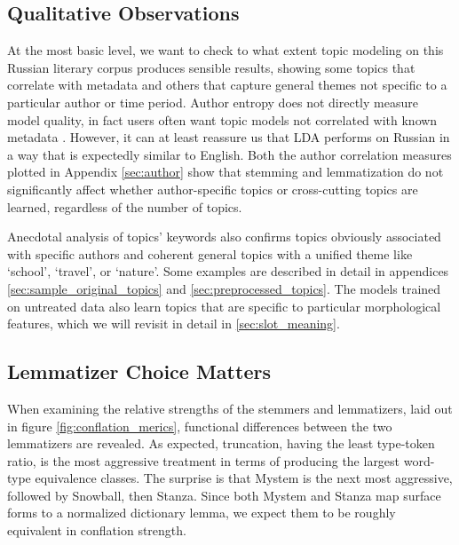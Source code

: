 \documentclass[11pt,a4paper]{article}
\begin{document}
\subsection{Qualitative Observations}
At the most basic level, we want to check to what extent topic modeling on this Russian literary corpus produces sensible results, showing some topics that correlate with metadata and others that capture general themes not specific to a particular author or time period. Author entropy does not directly measure model quality, in fact users often want topic models not correlated with known metadata \cite{Thompson2018AuthorlessTM}. However, it can at least reassure us that LDA performs on Russian in a way that is expectedly similar to English. Both the author correlation measures plotted in Appendix \ref{sec:author} show that stemming and lemmatization do not significantly affect whether author-specific topics or cross-cutting topics are learned, regardless of the number of topics.

Anecdotal analysis of topics' keywords also confirms topics obviously associated with specific authors and coherent general topics with a unified theme like `school', `travel', or `nature'. Some examples are described in detail in appendices \ref{sec:sample_original_topics} and \ref{sec:preprocessed_topics}. The models trained on untreated data also learn topics that are specific to particular morphological features, which we will revisit in detail in \ref{sec:slot_meaning}.

\subsection{Lemmatizer Choice Matters}
When examining the relative strengths of the stemmers and lemmatizers, laid out in figure \ref{fig:conflation_merics}, functional differences between the two lemmatizers are revealed. As expected, truncation, having the least type-token ratio, is the most aggressive treatment in terms of producing the largest word-type equivalence classes. The surprise is that Mystem is the next most aggressive, followed by Snowball, then Stanza. Since both Mystem and Stanza map surface forms to a normalized dictionary lemma, we expect them to be roughly equivalent in conflation strength.
\end{document}
